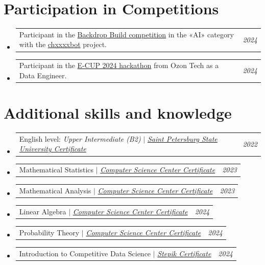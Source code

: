\documentclass[a4paper, 11pt]{article}
\makeatletter
\newcommand{\resumeProjectHeading}[2]{
    \item
    \begin{tabular*}{0.97\textwidth}{l@{\extracolsep{\fill}}r}
      \small#1 & #2 \\
    \end{tabular*}\vspace{-6pt}
}
\newcommand{\resumeSubHeadingListStart}{\begin{itemize}[leftmargin=0.15in, label={}]}
\newcommand{\resumeSubHeadingListEnd}{\end{itemize}}
\makeatother
\begin{document}
\section{Participation in Competitions}
    \resumeSubHeadingListStart
    
        \resumeProjectHeading
            {Participant in the  \href{https://backdropbuild.com/}{Backdrop Build competition} in the «AI» category with the \href{https://github.com/trxxxxkov/chxxxxbot}{chxxxxbot} project.}{\emph{2024}}
        \resumeProjectHeading
            {Participant in the \href{https://e-cup-ozon.ru/\#about}{E-CUP 2024 hackathon} from Ozon Tech as a Data Engineer.}{\emph{2024}}

    \resumeSubHeadingListEnd


\section{Additional skills and knowledge}
    \resumeSubHeadingListStart
        \resumeProjectHeading
            {English level: \textit{Upper Intermediate (B2)} $|$ \emph{\href{https://guestbook.spbu.ru/poslednie-obrashcheniya/9-prorektory-spbgu/babelyuk-ekaterina-gennadevna/7781-status-sertifikata-podtverzhdayushchego-uroven-b2-po-anglijskomu-yazyku.html}{Saint Petersburg State University Certificate}}}{\emph{2022}}    
        \resumeProjectHeading
            {Mathematical Statistics $|$ \emph{\href{https://stepik.org/cert/2197375}{Computer Science Center Certificate}}}{\emph{2023}}
        \resumeProjectHeading
            {Mathematical Analysis $|$ \emph{\href{https://stepik.org/cert/2202369}{Computer Science Center Certificate}}}{\emph{2023}}
        \resumeProjectHeading
            {Linear Algebra $|$ \emph{\href{https://stepik.org/cert/2378334}{Computer Science Center Certificate}}}{\emph{2024}}
        \resumeProjectHeading
            {Probability Theory $|$ \emph{\href{https://stepik.org/cert/2536313}{Computer Science Center Certificate}}}{\emph{2024}}
        \resumeProjectHeading
            {Introduction to Competitive Data Science $|$ \emph{\href{https://stepik.org/cert/2580765}{Stepik Certificate}}}{\emph{2024}}

    \resumeSubHeadingListEnd

\end{document}
